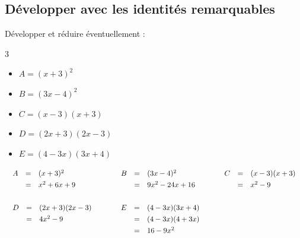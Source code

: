 \subsection{Développer avec les identités remarquables}

\begin{methode}
	Développer et réduire éventuellement :
	\begin{multicols}{3}
		\begin{itemize}
			\item $A = (x + 3)^2$
			\item $B = (3x - 4)^2$
			\item $C = (x - 3)(x + 3)$
			\item $D = (2x + 3)(2x - 3)$
			\item $E = (4 - 3x)(3x + 4)$
		\end{itemize}
	\end{multicols}

	\begin{correction}
		\[
			\begin{array}{lll}%
				\def\arraystretch{1.3}%
				\begin{array}{rcl}%
					A & = & (x + 3)^2    \\
					  & = & x^2 + 6x + 9 \\
				\end{array} \quad & \quad %
				\def\arraystretch{1.3}%
				\begin{array}{rcl}%
					B & = & (3x - 4)^2      \\
					  & = & 9x^2 - 24x + 16 \\
				\end{array} \quad & \quad %
				\def\arraystretch{1.3}%
				\begin{array}{rcl}%
					C & = & (x - 3)(x + 3) \\
					  & = & x^2 - 9        \\
				\end{array} \\&\\%
				\def\arraystretch{1.3}%
				\begin{array}{rcl}%
					D & = & (2x + 3)(2x - 3) \\
					  & = & 4x^2 - 9         \\
					  &   &                  \\
				\end{array} \quad & \quad %
				\def\arraystretch{1.3}%
				\begin{array}{rcl}%
					E & = & (4 - 3x)(3x + 4) \\
					  & = & (4 - 3x)(4 + 3x) \\
					  & = & 16 - 9x^2        \\
				\end{array} & ~ %
			\end{array}%
		\]
	\end{correction}
\end{methode}

